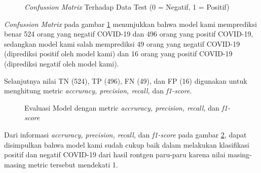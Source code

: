 \begin{figure}[h!]
  \centering
  \caption{\textit{Confussion Matrix} Terhadap Data Test (0 = Negatif, 1 = Positif)}
  \label{cm}
\end{figure}

\textit{Confussion Matrix} pada gambar \ref{cm} menunjukkan bahwa model kami memprediksi benar 524 orang yang negatif COVID-19 dan 496 orang yang positif COVID-19, sedangkan model kami salah memprediksi 49 orang yang negatif COVID-19 (diprediksi positif oleh model kami) dan 16 orang yang positif COVID-19 (diprediksi negatif oleh model kami).

Selanjutnya nilai TN (524), TP (496), FN (49), dan FP (16) digunakan untuk menghitung metric \textit{accruracy, precision, recall,} dan \textit{f1-score}.

\begin{figure}
  \centering
  \caption{Evaluasi Model dengan metric \textit{accruracy, precision, recall,} dan \textit{f1-score}}
  \label{report}
\end{figure}

Dari informasi \textit{accruracy, precision, recall,} dan \textit{f1-score} pada gambar \ref{report}, dapat disimpulkan bahwa model kami sudah cukup baik dalam melakukan klasifikasi positif dan negatif COVID-19 dari hasil rontgen paru-paru karena nilai masing-masing metric tersebut mendekati 1.


